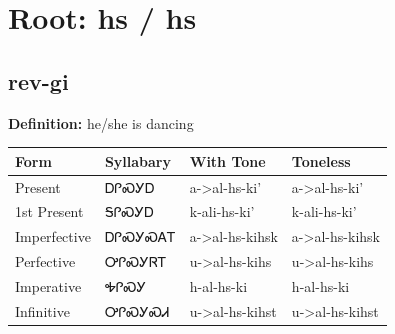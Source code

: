 \documentclass{article}%
\begin{document}
%
\normalsize%
\section*{Root: hs / hs}%
\subsection*{rev-gi}%
\textbf{Definition: }%
he/she is dancing%
\\[0.5em]%
\begin{tabular}{|l|l|l|l|}%
\hline%
\textbf{Form}&\textbf{Syllabary}&\textbf{With Tone}&\textbf{Toneless}\\%
\hline%
Present&ᎠᎵᏍᎩᎠ&a{-}>al{-}hs{-}ki'&a{-}>al{-}hs{-}ki'\\%
1st Present&ᎦᎵᏍᎩᎠ&k{-}ali{-}hs{-}ki'&k{-}ali{-}hs{-}ki'\\%
Imperfective&ᎠᎵᏍᎩᏍᎪᎢ&a{-}>al{-}hs{-}kihsk&a{-}>al{-}hs{-}kihsk\\%
Perfective&ᎤᎵᏍᎩᏒᎢ&u{-}>al{-}hs{-}kihs&u{-}>al{-}hs{-}kihs\\%
Imperative&ᎭᎵᏍᎩ&h{-}al{-}hs{-}ki&h{-}al{-}hs{-}ki\\%
Infinitive&ᎤᎵᏍᎩᏍᏗ&u{-}>al{-}hs{-}kihst&u{-}>al{-}hs{-}kihst\\%
\hline%
\end{tabular}%
\\[1em]%
\end{document}
